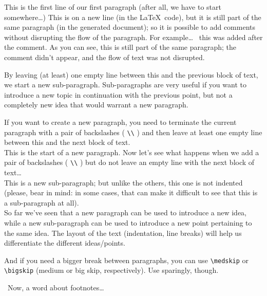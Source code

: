 This is the first line of our first paragraph (after all, we have to start somewhere\ldots)
This is on a new line (in the \LaTeX\ code), but it is still part of the same paragraph (in the generated document); so it is possible to add comments without disrupting the flow of the paragraph. For example\dots\ 
this was added after the comment. As you can see, this is still part of the same paragraph; the comment didn't appear, and the flow of text was not disrupted.


By leaving (at least) one empty line between this and the previous block of text, we start a new sub-paragraph. Sub-paragraphs are very useful if you want to introduce a new topic in continuation with the previous point, but not a completely new idea that would warrant a new paragraph.

If you want to create a new paragraph, you need to terminate the current paragraph with a pair of backslashes ( \texttt{\textbackslash\textbackslash} ) and then leave at least one empty line between this and the next block of text.
\\


This is the start of a new paragraph. Now let's see what happens when we add a pair of backslashes ( \texttt{\textbackslash\textbackslash} ) but do not leave an empty line with the next block of text\dots 
\\
This is a new sub-paragraph; but unlike the others, this one is not indented (please, bear in mind: in some cases, that can make it difficult to see that this is a sub-paragraph at all).
\\

So far we've seen that a new paragraph can be used to introduce a new idea, while a new sub-paragraph can be used to introduce a new point pertaining to the same idea. The layout of the text (indentation, line breaks) will help us differentiate the different ideas/points.
\\

\medskip

And if you need a bigger break between paragraphs, you can use \texttt{\textbackslash medskip} or \texttt{\textbackslash bigskip} (medium or big skip, respectively). Use sparingly, though.

\begin{center}
	\textreferencemark\textreferencemark\ 
	Now, a word about footnotes\dots\ 
	\textreferencemark\textreferencemark
\end{center}

